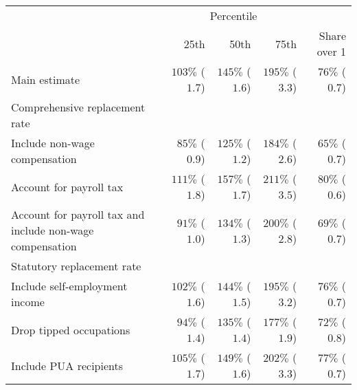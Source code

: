 \captionsetup[table]{labelformat=empty,skip=1pt}
\begin{tabular}{lrrrr}
\toprule
& \multicolumn{3}{c}{Percentile} & \\ 
 \cmidrule(lr){2-4}
 & 25th & 50th & 75th & Share over 1 \\ 
\midrule
Main estimate & $103\%$ ($1.7$)  & $145\%$ ($1.6$)  & $195\%$ ($3.3$)  & $76\%$ ($0.7$)  \\ 
\midrule
\multicolumn{1}{l}{Comprehensive replacement rate} \\\hspace{0.5cm} Include non-wage compensation & $85\%$ ($0.9$)  & $125\%$ ($1.2$)  & $184\%$ ($2.6$)  & $65\%$ ($0.7$)  \\ 
\hspace{0.5cm} Account for payroll tax & $111\%$ ($1.8$)  & $157\%$ ($1.7$)  & $211\%$ ($3.5$)  & $80\%$ ($0.6$)  \\ 
\hspace{0.5cm} Account for payroll tax and include non-wage compensation & $91\%$ ($1.0$)  & $134\%$ ($1.3$)  & $200\%$ ($2.8$)  & $69\%$ ($0.7$)  \\ 
\midrule
\multicolumn{1}{l}{Statutory replacement rate} \\\hspace{0.5cm} Include self-employment income & $102\%$ ($1.6$)  & $144\%$ ($1.5$)  & $195\%$ ($3.2$)  & $76\%$ ($0.7$)  \\ 
\hspace{0.5cm} Drop tipped occupations & $94\%$ ($1.4$)  & $135\%$ ($1.4$)  & $177\%$ ($1.9$)  & $72\%$ ($0.8$)  \\ 
\hspace{0.5cm} Include PUA recipients & $105\%$ ($1.7$)  & $149\%$ ($1.6$)  & $202\%$ ($3.3$)  & $77\%$ ($0.7$)  \\ 
\bottomrule
\end{tabular}

